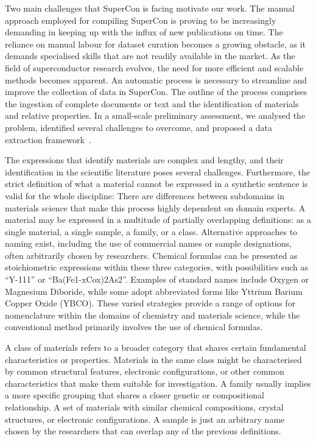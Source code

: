 Two main challenges that SuperCon is facing motivate our work. 
The manual approach employed for compiling SuperCon is proving to be increasingly demanding in keeping up with the influx of new publications on time. The reliance on manual labour for dataset curation becomes a growing obstacle, as it demands specialised skills that are not readily available in the market. As the field of superconductor research evolves, the need for more efficient and scalable methods becomes apparent.
An automatic process is necessary to streamline and improve the collection of data in SuperCon. 
The outline of the process comprises the ingestion of complete documents or text and the identification of materials and relative properties.  
In a small-scale preliminary assessment, we analysed the problem, identified several challenges to overcome, and proposed a data extraction framework~\cite{foppiano2019proposal}.

The expressions that identify materials are complex and lengthy, and their identification in the scientific literature poses several challenges.
Furthermore, the strict definition of what a material cannot be expressed in a synthetic sentence is valid for the whole discipline: There are differences between subdomains in materials science that make this process highly dependent on domain experts.
A material may be expressed in a multitude of partially overlapping definitions: as a single material, a single sample, a family, or a class.
Alternative approaches to naming exist, including the use of commercial names or sample designations, often arbitrarily chosen by researchers. Chemical formulas can be presented as stoichiometric expressions within these three categories, with possibilities such as ``Y-111'' or ``Ba(Fe1-xCox)2As2''. Examples of standard names include Oxygen or Magnesium Diboride, while some adopt abbreviated forms like Yttrium Barium Copper Oxide (YBCO). These varied strategies provide a range of options for nomenclature within the domains of chemistry and materials science, while the conventional method primarily involves the use of chemical formulas.

A class of materials refers to a broader category that shares certain fundamental characteristics or properties. Materials in the same class might be characterised by common structural features, electronic configurations, or other common characteristics that make them suitable for investigation. 
A family usually implies a more specific grouping that shares a closer genetic or compositional relationship. A set of materials with similar chemical compositions, crystal structures, or electronic configurations. 
A sample is just an arbitrary name chosen by the researchers that can overlap any of the previous definitions. 

